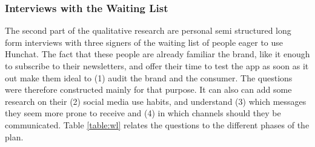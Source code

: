 \documentclass[12pt]{article}
\begin{document}
\subsubsection{Interviews with the Waiting List}
The second part of the qualitative research are personal semi structured long form interviews  with three signers of the waiting list of people eager to use Hunchat. The fact that these people are already familiar the brand, like it enough to subscribe to their newsletters, and offer their time to test the app as soon as it out make them ideal to (1) audit the brand and the consumer. The questions were therefore constructed mainly for that purpose. It can also can add some research on their (2) social media use habits, and understand (3) which messages they seem more prone to receive and (4) in which channels should they be communicated. Table \ref{table:wl} relates the questions to the different phases of the plan.
\end{document}
